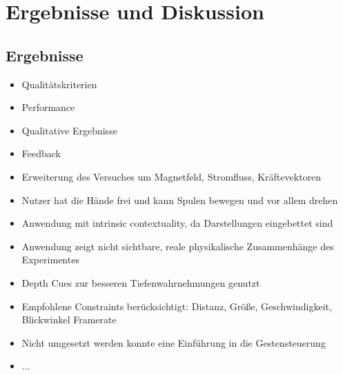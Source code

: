\section{Ergebnisse und Diskussion}
\label{sec-6}

\subsection{Ergebnisse}

\begin{itemize}
	\item Qualitätskriterien
	\item Performance
	\item Qualitative Ergebnisse
	\item Feedback
\end{itemize}

\begin{itemize}
	\item Erweiterung des Versuches um Magnetfeld, Stromfluss, Kräftevektoren
	\item Nutzer hat die Hände frei und kann Spulen bewegen und vor allem drehen
	\item Anwendung mit intrinsic contextuality, da Darstellungen eingebettet sind
	\item Anwendung zeigt nicht sichtbare, reale physikalische Zusammenhänge des Experimentes
	\item Depth Cues zur besseren Tiefenwahrnehmungen genutzt
	\item Empfohlene Constraints berücksichtigt:
	\subitem Distanz, Größe, Geschwindigkeit, Blickwinkel
	\subitem Framerate
	\item Nicht umgesetzt werden konnte eine Einführung in die Gestensteuerung
	\item ...
\end{itemize}

